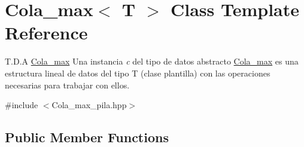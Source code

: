 \hypertarget{class_cola__max}{}\section{Cola\+\_\+max$<$ T $>$ Class Template Reference}
\label{class_cola__max}


T.\+D.\+A \mbox{\hyperlink{class_cola__max}{Cola\+\_\+max}} Una instancia {\itshape c} del tipo de datos abstracto {\ttfamily \mbox{\hyperlink{class_cola__max}{Cola\+\_\+max}}} es una estructura lineal de datos del tipo T (clase plantilla) con las operaciones necesarias para trabajar con ellos.  




{\ttfamily \#include $<$Cola\+\_\+max\+\_\+pila.\+hpp$>$}

\subsection*{Public Member Functions}
